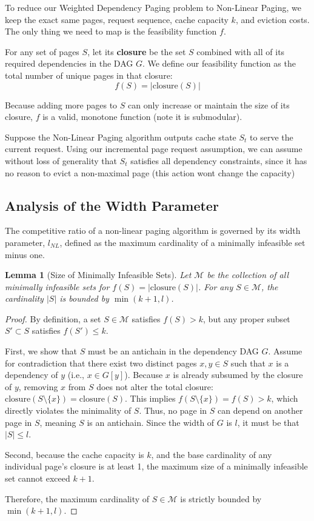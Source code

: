 \documentclass[a4paper]{article}
\newtheorem{lemma}{Lemma}      %
\begin{document}
To reduce our Weighted Dependency Paging problem to Non-Linear Paging, we keep the exact same pages, request sequence, cache capacity $k$, and eviction costs. The only thing we need to map is the feasibility function $f$. 

For any set of pages $S$, let its \textbf{closure} be the set $S$ combined with all of its required dependencies in the DAG $G$. We define our feasibility function as the total number of unique pages in that closure:
$$ f(S) = |\text{closure}(S)| $$

Because adding more pages to $S$ can only increase or maintain the size of its closure, $f$ is a valid, monotone function (note it is submodular). 

Suppose the Non-Linear Paging algorithm outputs cache state $S_t$ to serve the current request. 
Using our incremental page request assumption, we can assume without loss of generality that $S_t$ satisfies all dependency constraints, since it has no reason to evict a non-maximal page (this action wont change the capacity)


\subsection{Analysis of the Width Parameter}
The competitive ratio of a non-linear paging algorithm is governed by its width parameter, $l_{NL}$, defined as the maximum cardinality of a minimally infeasible set minus one. 

\begin{lemma}[Size of Minimally Infeasible Sets]
\label{lemma:minimally_infeasible_bound}
Let $\mathcal{M}$ be the collection of all minimally infeasible sets for $f(S) = |\text{closure}(S)|$. For any $S \in \mathcal{M}$, the cardinality $|S|$ is bounded by $\min(k+1, l)$.
\end{lemma}
\begin{proof}
By definition, a set $S \in \mathcal{M}$ satisfies $f(S) > k$, but any proper subset $S' \subset S$ satisfies $f(S') \le k$. 

First, we show that $S$ must be an antichain in the dependency DAG $G$. Assume for contradiction that there exist two distinct pages $x, y \in S$ such that $x$ is a dependency of $y$ (i.e., $x \in G[y]$). Because $x$ is already subsumed by the closure of $y$, removing $x$ from $S$ does not alter the total closure: $\text{closure}(S \setminus \{x\}) = \text{closure}(S)$. This implies $f(S \setminus \{x\}) = f(S) > k$, which directly violates the minimality of $S$. Thus, no page in $S$ can depend on another page in $S$, meaning $S$ is an antichain. Since the width of $G$ is $l$, it must be that $|S| \le l$.

Second, because the cache capacity is $k$, and the base cardinality of any individual page's closure is at least 1, the maximum size of a minimally infeasible set cannot exceed $k+1$. 

Therefore, the maximum cardinality of $S \in \mathcal{M}$ is strictly bounded by $\min(k+1, l)$.
\end{proof}
\end{document}
